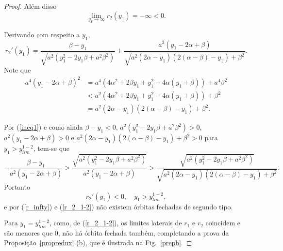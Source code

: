 \begin{proof}
Além disso
\begin{equation}
\label{r_infty}
\lim_{y_1\to \infty}r_2(y_1)=-\infty<0.
\end{equation}

Derivando com respeito a $y_1$,
$$
r_2'(y_1)=\frac{\beta-y_1}{\sqrt{a^2 (y_1^2 - 2 y_1 \beta + a^2 \beta^2)}} + \frac{a^2(y_1 - 2 \alpha + \beta)}{\sqrt{ a^2(2\alpha-y_1) (2(\alpha-\beta)-y_1)+\beta^2}}.
$$
Note que
\begin{align*}
a^4(y_1 - 2 \alpha + \beta)^2&=a^4(4\alpha^2  +2 \beta y_1 + y_1^2 - 4 \alpha (y_1+\beta))+a^4\beta^2
\\&<a^2(4\alpha^2+2\beta y_1+y_1^2-4\alpha(y_1+\beta))+\beta^2
\\&= a^2(2\alpha-y_1) (2(\alpha-\beta)-y_1)+\beta^2.
\end{align*}

Por (\ref{ineq1}) e como ainda $\beta-y_1<0$, $a^2 (y_1^2 - 2 y_1 \beta + a^2 \beta^2)>0$, $a^2(y_1 - 2 \alpha + \beta)>0$ e $a^2(2\alpha-y_1) (2(\alpha-\beta)-y_1)+\beta^2>0$ para $y_1> y_{lim}^{1-2}$, tem-se que
$$
-\frac{\beta-y_1}{a^2(y_1 - 2 \alpha + \beta)}> \frac{\sqrt{a^2 (y_1^2 - 2 y_1 \beta + a^2 \beta^2)}}{a^2(y_1 - 2 \alpha + \beta)}>\frac{\sqrt{a^2 (y_1^2 - 2 y_1 \beta + a^2 \beta^2)}}{\sqrt{a^2(2\alpha-y_1) (2(\alpha-\beta)-y_1)+\beta^2}}.
$$
Portanto
\begin{equation}
\label{r_2'}
r_2'(y_1)<0,\quad y_1> y_{lim}^{1-2},
\end{equation}
e por (\ref{r_infty}) e (\ref{r_2_1-2}) não existem órbitas fechadas de segundo tipo. 

Para $y_1=y_{lim}^{1-2}$, como, de (\ref{r_2_1-2}), os limites laterais de $r_1$ e $r_2$ coincidem e são menores que 0, não há órbita fechada também, completando a prova da Proposição~\ref{propredux} (b), que é ilustrada na Fig.~\ref{prepb}.


\end{proof}
